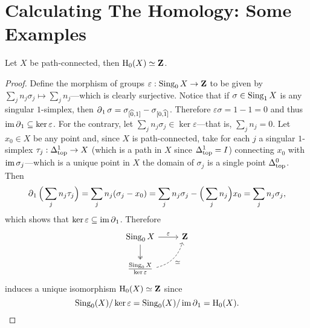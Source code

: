 \section{Calculating The Homology: Some Examples}

\begin{proposition}
    \label{prop:path-connected-homology0-is-Z}
    Let \(X\) be path-connected, then \(\operatorname{H}_0(X) \simeq \mathbf{Z}\).
\end{proposition}

\begin{proof}
    Define the morphism of groups \(\varepsilon: \operatorname{Sing}_0 X \to \mathbf{Z}\) to be given by
    \(\sum_j n_j \sigma_j \mapsto \sum_j n_j\)---which is clearly surjective. Notice
    that if \(\sigma \in \operatorname{Sing}_1 X\) is any singular \(1\)-simplex, then
    \(\operatorname{\partial}_1 \sigma = \sigma_{[\widehat 0, 1]} - \sigma_{[0, \widehat
                1]}\). Therefore \(\varepsilon \sigma = 1 - 1 = 0\) and thus
    \(\operatorname{im} \operatorname{\partial}_1 \subseteq \ker \varepsilon\). For the contrary, let
    \(\sum_j n_j \sigma_j \in \ker \varepsilon\)---that is, \(\sum_j n_j = 0\). Let
    \(x_0 \in X\) be any point and, since \(X\) is path-connected, take for each
    \(j\) a singular \(1\)-simplex \(\tau_j: \Delta_{\text{top}}^1 \to X\) (which is a path in
    \(X\) since \(\Delta_{\text{top}}^1 = I\)) connecting \(x_0\) with \(\operatorname{im} \sigma_j\)---which
    is a unique point in \(X\) the domain of \(\sigma_j\) is a single point
    \(\Delta_{\text{top}}^0\). Then
    \[
        \operatorname{\partial}_1 \Big( \sum_j n_j \tau_j \Big) = \sum_j n_j (\sigma_j - x_0)
        = \sum_j n_j \sigma_j - \Big(\sum_j n_j\Big) x_0
        = \sum_j n_j \sigma_j,
    \]
    which shows that \(\ker \varepsilon \subseteq \operatorname{im} \operatorname{\partial}_1\). Therefore
    \[
        \begin{tikzcd}
            \Sing_0 X \ar[r, "\varepsilon"] \ar[d, two heads]
            &\Z \\
            \frac{\Sing_0 X}{\ker \varepsilon}
            \ar[ru, dashed, "\dis"', bend right] &
        \end{tikzcd}
    \]
    induces a unique isomorphism \(\operatorname{H}_0(X) \simeq \mathbf{Z}\) since
    \[
        \operatorname{Sing}_0(X)/\ker\varepsilon = \operatorname{Sing}_0(X)/\operatorname{im} \operatorname{\partial}_1 = \operatorname{H}_0(X).
    \]
\end{proof}

